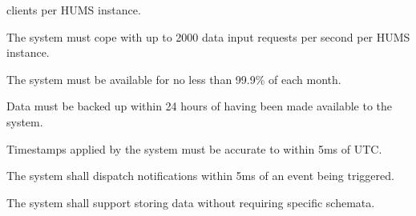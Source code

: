 \begin{description}
	clients per HUMS instance. 
	\item[\nfr{9}]  The system must cope with up to 2000 data input 
	requests per second per HUMS instance. 
	\item[\nfr{10}] The system must be available for no less than 99.9\% of 
	each month.
	\item[\nfr{11}]  Data must be backed up within 24 hours of having been 
	made available to the system.
	 \item[\nfr{12}] Timestamps applied by the system must be accurate to 
	within 5ms of UTC.
	\item[\nfr{13}]  The system shall dispatch notifications within 5ms of an 
	event being triggered.
	\item[\nfr{14}] The system shall support storing data without requiring 
	specific schemata.
\end{description}


